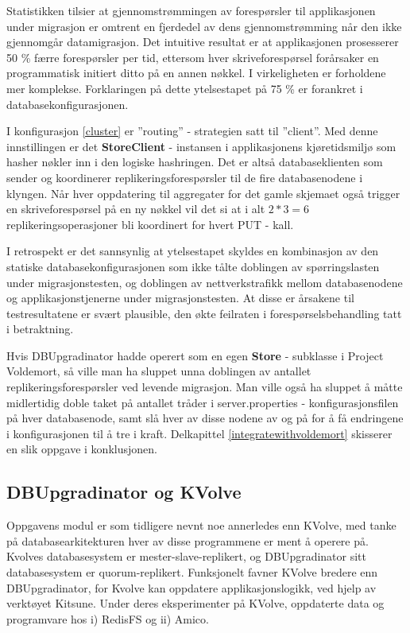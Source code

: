 Statistikken tilsier at gjennomstrømmingen av forespørsler til applikasjonen under migrasjon er omtrent en fjerdedel av dens gjennomstrømming når den ikke gjennomgår datamigrasjon. Det intuitive resultat er at applikasjonen prosesserer 50 \% færre forespørsler per tid, ettersom hver skriveforespørsel forårsaker en programmatisk initiert ditto på en annen nøkkel. I virkeligheten er forholdene mer komplekse. Forklaringen på dette ytelsestapet  på 75 \% er forankret i databasekonfigurasjonen.

I konfigurasjon \ref{cluster} er ''routing'' - strategien satt til ''client''. Med denne innstillingen er det \textbf{StoreClient} - instansen i applikasjonens kjøretidsmiljø som hasher nøkler inn i den logiske hashringen. Det er altså databaseklienten som sender og koordinerer replikeringsforespørsler til de fire databasenodene i klyngen. Når hver oppdatering til aggregater for det gamle skjemaet også trigger en skriveforespørsel på en ny nøkkel vil det si at i alt \(2 * 3 = 6\) replikeringsoperasjoner bli koordinert for hvert PUT - kall.

I retrospekt er det sannsynlig at ytelsestapet skyldes en kombinasjon av den statiske databasekonfigurasjonen som ikke tålte doblingen av spørringslasten under migrasjonstesten, og doblingen av nettverkstrafikk mellom databasenodene og applikasjonstjenerne under migrasjonstesten. At disse er årsakene til testresultatene er svært plausible, den økte feilraten i forespørselsbehandling tatt i betraktning. 

Hvis DBUpgradinator hadde operert som en egen \textbf{Store} - subklasse i Project Voldemort, så ville man ha sluppet unna doblingen av antallet replikeringsforespørsler ved levende migrasjon. Man ville også ha sluppet å måtte midlertidig doble taket på antallet tråder i server.properties - konfigurasjonsfilen på hver databasenode, samt slå hver av disse nodene av og på for å få endringene i konfigurasjonen til å tre i kraft. Delkapittel \ref{integratewithvoldemort} skisserer en slik oppgave i konklusjonen.

\subsection{DBUpgradinator og KVolve}

Oppgavens modul er som tidligere nevnt noe annerledes enn KVolve, med tanke på databasearkitekturen hver av disse programmene er ment å operere på. Kvolves databasesystem er mester-slave-replikert, og DBUpgradinator sitt databasesystem er quorum-replikert. Funksjonelt favner KVolve bredere enn DBUpgradinator, for Kvolve kan oppdatere applikasjonslogikk, ved hjelp av verktøyet Kitsune. Under deres eksperimenter på KVolve, oppdaterte \cite{saur2016} data og programvare hos i) RedisFS og ii) Amico.

